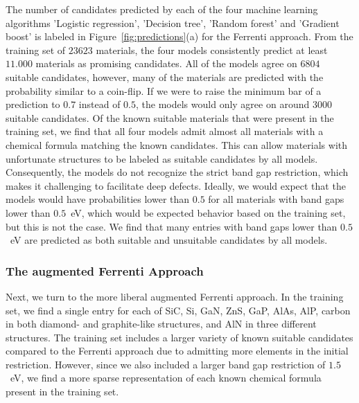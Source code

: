 \documentclass[superscriptaddress,unsortedaddress,
 amsmath,amssymb,
 aps,
]{revtex4-2}
\begin{document}


The number of candidates predicted by each of the four machine learning algorithms 'Logistic regression', 'Decision tree', 'Random forest' and 'Gradient boost' is labeled in Figure~\ref{fig:predictions}(a) for the Ferrenti approach. 
From the training set of $23623$ materials, the four models consistently predict at least $11.000$ materials as promising candidates. All of the models agree on $6804$ suitable candidates, however, many of the materials are predicted with the probability similar to a coin-flip. 
If we were to raise the minimum bar of a prediction to
$0.7$ instead of $0.5$, the models would only agree on around $3000$ suitable candidates. 
Of the known suitable materials that were present in the training set, we find that all four models admit almost all materials with a chemical formula matching the known candidates. This can allow materials with unfortunate structures to be labeled as suitable candidates by all models. Consequently, the models do not recognize the strict band gap restriction, which makes it challenging to facilitate deep defects. Ideally, we would expect that the models would have probabilities lower than $0.5$ for all materials with band gaps lower than $0.5$~eV, which would be expected behavior based on the training set, but this is not the case. We find that many entries with band gaps lower than $0.5$~eV are predicted as both suitable and unsuitable candidates by all models. 

\subsubsection*{The augmented Ferrenti Approach}

Next, we turn to the more liberal augmented Ferrenti approach. In the training set, we find a single entry for each of SiC, Si, GaN, ZnS, GaP, AlAs, AlP, carbon in both diamond- and graphite-like structures, and AlN in three different structures. The training set includes a larger variety of known suitable candidates compared to the Ferrenti approach due to admitting more elements in the initial restriction. However, since we also included a larger band gap restriction of $1.5$~eV, we find a more sparse representation of each known chemical formula present in the training set.
\end{document}

